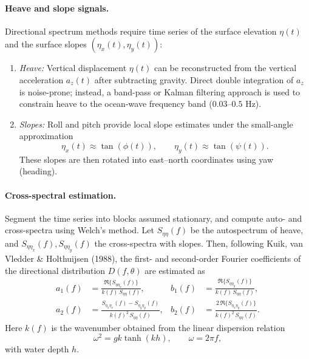 \documentclass[11pt,letterpaper]{article}
\begin{document}
\paragraph{Heave and slope signals.}
Directional spectrum methods require time series of the surface elevation $\eta(t)$ and the surface slopes $(\eta_x(t),\eta_y(t))$:
\begin{enumerate}
  \item \emph{Heave:} Vertical displacement $\eta(t)$ can be reconstructed from the vertical acceleration $a_z(t)$ after subtracting gravity. Direct double integration of $a_z$ is noise-prone; instead, a band-pass or Kalman filtering approach is used to constrain heave to the ocean-wave frequency band ($0.03$--$0.5$ Hz).
  \item \emph{Slopes:} Roll and pitch provide local slope estimates under the small-angle approximation
  \begin{equation}
  \eta_x(t) \approx \tan(\phi(t)), \qquad \eta_y(t) \approx \tan(\psi(t)).
  \end{equation}
  These slopes are then rotated into east--north coordinates using yaw (heading).
\end{enumerate}

\paragraph{Cross-spectral estimation.}
Segment the time series into blocks assumed stationary, and compute auto- and cross-spectra using Welch's method. Let $S_{\eta\eta}(f)$ be the autospectrum of heave, and $S_{\eta\eta_x}(f), S_{\eta\eta_y}(f)$ the cross-spectra with slopes. Then, following Kuik, van Vledder \& Holthuijsen (1988), the first- and second-order Fourier coefficients of the directional distribution $D(f,\theta)$ are estimated as
\begin{align}
a_1(f) &= \frac{\Re\{S_{\eta\eta_x}(f)\}}{k(f)\,S_{\eta\eta}(f)}, 
& b_1(f) &= \frac{\Re\{S_{\eta\eta_y}(f)\}}{k(f)\,S_{\eta\eta}(f)}, \\
a_2(f) &= \frac{S_{\eta_x\eta_x}(f) - S_{\eta_y\eta_y}(f)}{k(f)^2\,S_{\eta\eta}(f)}, 
& b_2(f) &= \frac{2\,\Re\{S_{\eta_x\eta_y}(f)\}}{k(f)^2\,S_{\eta\eta}(f)}.
\end{align}
Here $k(f)$ is the wavenumber obtained from the linear dispersion relation
\begin{equation}
\omega^2 = gk \tanh(kh), \qquad \omega=2\pi f,
\end{equation}
with water depth $h$.
\end{document}
